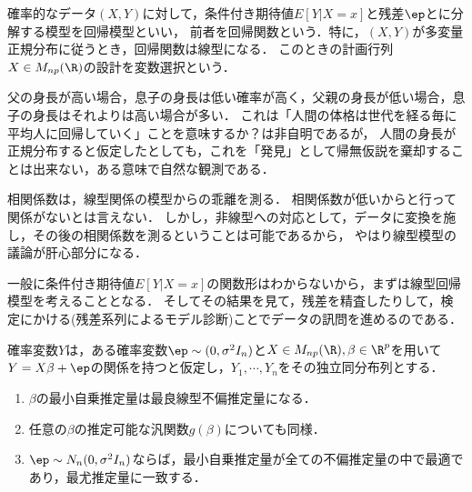 \documentclass[uplatex,dvipdfmx]{jsreport}
\begin{document}
\begin{tcolorbox}[colframe=ForestGreen, colback=ForestGreen!10!white,breakable,colbacktitle=ForestGreen!40!white,coltitle=black,fonttitle=\bfseries\sffamily,
title=]
    確率的なデータ$(X,Y)$に対して，条件付き期待値$E[Y|X=x]$と残差$\ep$とに分解する模型を回帰模型といい，
    前者を回帰関数という．特に，$(X,Y)$が多変量正規分布に従うとき，回帰関数は線型になる．
    このときの計画行列$X\in M_{np}(\R)$の設計を変数選択という．
\end{tcolorbox}

\begin{history}
    父の身長が高い場合，息子の身長は低い確率が高く，父親の身長が低い場合，息子の身長はそれよりは高い場合が多い．
    これは「人間の体格は世代を経る毎に平均人に回帰していく」ことを意味するか？は非自明であるが，
    人間の身長が正規分布すると仮定したとしても，これを「発見」として帰無仮説を棄却することは出来ない，ある意味で自然な観測である．
\end{history}

\begin{example}[線型模型の重要性]
    相関係数は，線型関係の模型からの乖離を測る．
    相関係数が低いからと行って関係がないとは言えない．
    しかし，非線型への対応として，データに変換を施し，その後の相関係数を測るということは可能であるから，
    やはり線型模型の議論が肝心部分になる．
\end{example}

\begin{remarks}
    一般に条件付き期待値$E[Y|X=x]$の関数形はわからないから，まずは線型回帰模型を考えることとなる．
    そしてその結果を見て，残差を精査したりして，検定にかける(残差系列によるモデル診断)ことでデータの訊問を進めるのである．
\end{remarks}

\begin{theorem}
    確率変数$Y$は，ある確率変数$\ep\sim(0,\sigma^2 I_n)$と$X\in M_{np}(\R),\beta\in\R^p$を用いて$Y=X\beta+\ep$の関係を持つと仮定し，$Y_1,\cdots,Y_n$をその独立同分布列とする．
    \begin{enumerate}
        \item $\beta$の最小自乗推定量は最良線型不偏推定量になる．
        \item 任意の$\beta$の推定可能な汎関数$g(\beta)$についても同様．
        \item $\ep\sim N_n(0,\sigma^2I_n)$ならば，最小自乗推定量が全ての不偏推定量の中で最適であり，最尤推定量に一致する．
    \end{enumerate}
\end{theorem}
\end{document}
